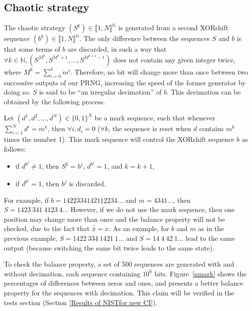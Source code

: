 \subsection{Chaotic strategy}
\label{Chaotic strategy}
The chaotic strategy $(S^k) \in \llbracket 1, N \rrbracket^\mathds{N}$ is generated from a second XORshift sequence $(b^k) \in \llbracket 1, N \rrbracket^\mathds{N}$. The only difference between the sequences $S$ and $b$ is that some terms of $b$ are discarded, in such a way that $\forall k \in \mathds{N}, (S^{M^k}, S^{M^k+1}, \hdots, S^{M^{k+1}-1})$ does not contain any given integer twice, where $M^k = \sum_{i=0}^k m^i$. Therefore, no bit will change more than once between two successive outputs of our PRNG, increasing the speed of the former generator by doing so. $S$ is said to be ``an irregular decimation'' of $b$. This decimation can be obtained by the following process.

Let $(d^1,d^2,\dots,d^N)\in \{0,1\}^N$ be a mark sequence, such that whenever $\sum_{i=1}^N d^i = m^k$,
then $\forall i, d_i=0$ ($\forall k$, the sequence is reset when $d$ contains $m^k$ times the number 1). This mark sequence will control the XORshift sequence $b$ as follows:
\begin{itemize}
\item if $d^{b^j} \neq 1$, then $S^k=b^j$, $d^{b^j} = 1$, and $k = k+1$,
\item if $d^{b^j}=1$, then $b^j$ is discarded.
\end{itemize}
For example, if $b = 142\underline{2}334 1421\underline{1}\underline{2}\underline{2}34...$ and $m = 4341...$, then $S=1423~341~4123~4...$ However, if we do not use the mark sequence, then one position may change more than once and the balance property will not be checked, due to the fact that $\bar{\bar{x}}=x$. As an example, for $b$ and $m$ as in the previous example, $S=1422~334~1421~1...$ and $S=14~4~42~1...$ lead to the same output (because switching the same bit twice leads to the same state).

 
To check the balance property, a set of 500
sequences are generated with and without decimation, each
sequence containing $10^6$ bits. Figure~\ref{nmark} shows the
percentages of differences between zeros and ones, and presents a better balance property for the sequences with decimation. This claim will be verified in the tests section (Section \ref{Results of NISTfor new CI}). 


